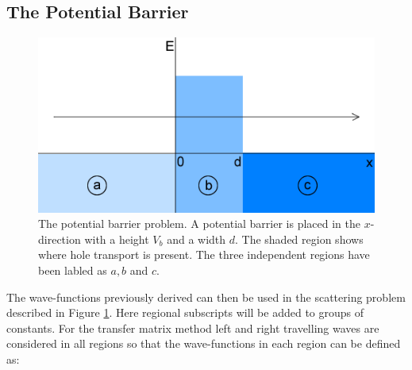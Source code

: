 \documentclass[12pt,a4paper]{article}
\begin{document}
		\subsection{The Potential Barrier}
		\label{weyl - Scattering Properties}
		\begin{figure}[h]
			\centerline{\includegraphics[scale=0.7]{images/weyl-symmetrical-flat}}
			\caption{The potential barrier problem. A potential barrier is placed in the $x$-direction with a height $V_{b}$ and a width $d$. The shaded region shows where hole transport is present. The three independent regions have been labled as $a,b$ and $c$.}
			\label{weyl-symmetrical-flat}
		\end{figure}
		The wave-functions previously derived can then be used in the scattering problem described in Figure \ref{weyl-symmetrical-flat}. Here regional subscripts will be added to groups of constants. For the transfer matrix method \cite{b18} left and right travelling waves are considered in all regions so that the wave-functions in each region can be defined as:
\end{document}
